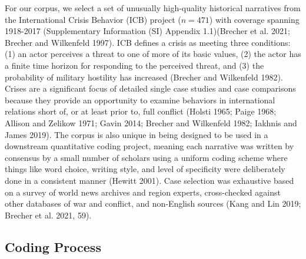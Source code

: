 \documentclass{article}
\begin{document}
For our corpus, we select a set of unusually high-quality historical
narratives from the International Crisis Behavior (ICB) project
(\(n=471\)) with coverage spanning 1918-2017 (Supplementary Information
(SI) Appendix 1.1)(Brecher et al. 2021; Brecher and Wilkenfeld 1997).
ICB defines a crisis as meeting three conditions: (1) an actor perceives
a threat to one of more of its basic values, (2) the actor has a finite
time horizon for responding to the perceived threat, and (3) the
probability of military hostility has increased (Brecher and Wilkenfeld
1982). Crises are a significant focus of detailed single case studies
and case comparisons because they provide an opportunity to examine
behaviors in international relations short of, or at least prior to,
full conflict (Holsti 1965; Paige 1968; Allison and Zelikow 1971; Gavin
2014; Brecher and Wilkenfeld 1982; Iakhnis and James 2019). The corpus
is also unique in being designed to be used in a downstream quantitative
coding project, meaning each narrative was written by consensus by a
small number of scholars using a uniform coding scheme where things like
word choice, writing style, and level of specificity were deliberately
done in a consistent manner (Hewitt 2001). Case selection was exhaustive
based on a survey of world news archives and region experts,
cross-checked against other databases of war and conflict, and
non-English sources (Kang and Lin 2019; Brecher et al. 2021, 59).

\hypertarget{coding-process}{%
\subsection{Coding Process}\label{coding-process}}
\end{document}
